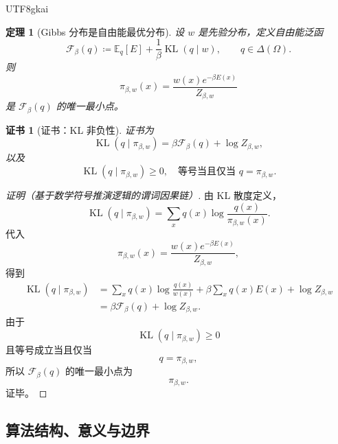 \documentclass[12pt]{article}
\newtheorem{theorem}{定理}[section]
\newtheorem{Certificate}{证书}[section]
\newcommand{\DefEq}{\coloneqq}
\begin{document}
\begin{CJK*}{UTF8}{gkai}
\begin{theorem}[Gibbs 分布是自由能最优分布]
\label{thm:tex55-free-energy-gibbs}
设 \(w\) 是先验分布，定义自由能泛函
\[
  \mathcal F_\beta(q)
  \DefEq
  \mathbb E_q[E]
  +
  \frac1\beta
  \operatorname{KL}(q\mid w),
  \qquad
  q\in\Delta(\Omega).
\]
则
\[
  \pi_{\beta,w}(x)
  =
  \frac{w(x)e^{-\beta E(x)}}{Z_{\beta,w}}
\]
是 \(\mathcal F_\beta(q)\) 的唯一最小点。
\end{theorem}

\begin{Certificate}[证书：KL 非负性]
\label{cert:tex55-free-energy-gibbs}
证书为
\[
  \operatorname{KL}(q\mid\pi_{\beta,w})
  =
  \beta\mathcal F_\beta(q)+\log Z_{\beta,w},
\]
以及
\[
  \operatorname{KL}(q\mid\pi_{\beta,w})\ge0,
  \quad
  \text{等号当且仅当 }q=\pi_{\beta,w}.
\]
\end{Certificate}

\begin{proof}[证明（基于数学符号推演逻辑的谓词因果链）]
由 KL 散度定义，
\[
  \operatorname{KL}(q\mid\pi_{\beta,w})
  =
  \sum_x q(x)\log\frac{q(x)}{\pi_{\beta,w}(x)}.
\]
代入
\[
  \pi_{\beta,w}(x)=\frac{w(x)e^{-\beta E(x)}}{Z_{\beta,w}},
\]
得到
\[
\begin{aligned}
  \operatorname{KL}(q\mid\pi_{\beta,w})
  &=
  \sum_x q(x)\log\frac{q(x)}{w(x)}
  +
  \beta\sum_x q(x)E(x)
  +
  \log Z_{\beta,w}\\
  &=
  \beta\mathcal F_\beta(q)+\log Z_{\beta,w}.
\end{aligned}
\]
由于
\[
  \operatorname{KL}(q\mid\pi_{\beta,w})\ge0
\]
且等号成立当且仅当
\[
  q=\pi_{\beta,w},
\]
所以 \(\mathcal F_\beta(q)\) 的唯一最小点为
\[
  \pi_{\beta,w}.
\]
证毕。
\end{proof}

\subsection{算法结构、意义与边界}
\label{subsec:tex55-law-algorithm-boundaries}


\end{CJK*}
\end{document}
